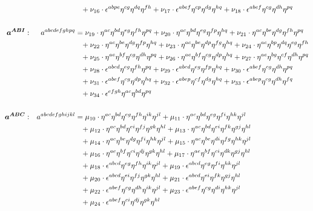 \documentclass[a4paper,12pt, DIV=14, BCOR=5mm, twoside, headsepline]{scrbook}
\begin{document}
\begin{align}
\begin{alignedat}{2}
& & &\hphantom{=}+\nu_{16}\cdot\epsilon^{abpe}\eta^{cg}\eta^{dq}\eta^{fh}+\nu_{17}\cdot\epsilon^{abef}\eta^{cp}\eta^{dg}\eta^{hq}+\nu_{18}\cdot\epsilon^{abef}\eta^{cg}\eta^{dh}\eta^{pq}\\
\\
\boldsymbol{a^{ABI}}&: \ \ \ & a^{abcdefghpq}  &=
\nu_{19}\cdot\eta^{ac}\eta^{bd}\eta^{eg}\eta^{fh}\eta^{pq}+\nu_{20}\cdot\eta^{ac}\eta^{bd}\eta^{eg}\eta^{fp}\eta^{hq}+\nu_{21}\cdot\eta^{ac}\eta^{be}\eta^{dg}\eta^{fh}\eta^{pq}\\
& & &\hphantom{=}+\nu_{22}\cdot\eta^{ac}\eta^{be}\eta^{dg}\eta^{fp}\eta^{hq}+\nu_{23}\cdot\eta^{ac}\eta^{be}\eta^{dp}\eta^{fg}\eta^{hq}+\nu_{24}\cdot\eta^{ac}\eta^{bp}\eta^{dq}\eta^{eg}\eta^{fh}\\
& & &\hphantom{=}+\nu_{25}\cdot\eta^{ae}\eta^{bf}\eta^{cg}\eta^{dh}\eta^{pq}+\nu_{26}\cdot\eta^{ae}\eta^{bf}\eta^{cg}\eta^{dp}\eta^{hq}+\nu_{27}\cdot\eta^{ae}\eta^{bg}\eta^{cf}\eta^{dh}\eta^{pq}\\
& & &\hphantom{=} +\nu_{28}\cdot\epsilon^{abcd}\eta^{eg}\eta^{fh}\eta^{pq}+\nu_{29}\cdot\epsilon^{abcd}\eta^{eg}\eta^{fp}\eta^{hq}+\nu_{30}\cdot\epsilon^{abef}\eta^{cg}\eta^{dh}\eta^{pq}\\
& & &\hphantom{=}+\nu_{31}\cdot\epsilon^{abef}\eta^{cg}\eta^{dp}\eta^{hq}+\nu_{32}\cdot\epsilon^{abep}\eta^{cf}\eta^{dg}\eta^{hq}+\nu_{33}\cdot\epsilon^{abep}\eta^{cg}\eta^{dh}\eta^{fq}\\
& & &\hphantom{=}+\nu_{34}\cdot\epsilon^{efgh}\eta^{ac}\eta^{bd}\eta^{pq}\\
\\
\boldsymbol{a^{ABC}}&: \ \ \ & a^{abcdefghijkl}  &=
\mu_{10}\cdot\eta^{ac}\eta^{bd}\eta^{eg}\eta^{fh}\eta^{ik}\eta^{jl}+\mu_{11}\cdot\eta^{ac}\eta^{bd}\eta^{eg}\eta^{fi}\eta^{hk}\eta^{jl}\\
& & &\hphantom{=}+\mu_{12}\cdot\eta^{ac}\eta^{bd}\eta^{ei}\eta^{fj}\eta^{gk}\eta^{hl}+\mu_{13}\cdot\eta^{ac}\eta^{bd}\eta^{ei}\eta^{fk}\eta^{gj}\eta^{hl}\\
& & &\hphantom{=}+\mu_{14}\cdot\eta^{ac}\eta^{be}\eta^{dg}\eta^{fi}\eta^{hk}\eta^{jl}+\mu_{15}\cdot\eta^{ac}\eta^{be}\eta^{di}\eta^{fg}\eta^{hk}\eta^{jl}\\
& & &\hphantom{=}+\mu_{16}\cdot\eta^{ae}\eta^{bf}\eta^{ci}\eta^{dj}\eta^{gk}\eta^{hl}+\mu_{17}\cdot\eta^{ae}\eta^{bf}\eta^{ci}\eta^{dk}\eta^{gj}\eta^{hl}\\
& & &\hphantom{=}+\mu_{18}\cdot\epsilon^{abcd}\eta^{eg}\eta^{fh}\eta^{ik}\eta^{jl}+\mu_{19}\cdot\epsilon^{abcd}\eta^{eg}\eta^{fi}\eta^{hk}\eta^{jl}\\
& & &\hphantom{=}+\mu_{20}\cdot\epsilon^{abcd}\eta^{ei}\eta^{fj}\eta^{gk}\eta^{hl}+\mu_{21}\cdot\epsilon^{abcd}\eta^{ei}\eta^{fk}\eta^{gj}\eta^{hl}\\
& & &\hphantom{=}+\mu_{22}\cdot\epsilon^{abef}\eta^{cg}\eta^{dh}\eta^{ik}\eta^{jl}+\mu_{23}\cdot\epsilon^{abef}\eta^{cg}\eta^{di}\eta^{hk}\eta^{jl}\\
& & &\hphantom{=}+\mu_{24}\cdot\epsilon^{abef}\eta^{ci}\eta^{dj}\eta^{gk}\eta^{hl}
\end{alignedat}
\end{align}
\end{document}
